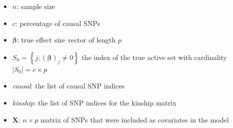 \documentclass[12pt,letter]{article}\usepackage[]{graphicx}\usepackage[]{color}
\newcommand{\bX}{\textbf{X}}
\newcommand{\bbeta}{\boldsymbol{\beta}}
\begin{document}
\begin{itemize}
	\item $n$: sample size
	\item $c$: percentage of causal SNPs
	\item $\bbeta$: true effect size vector of length $p$ 
	\item $S_0 = \left\lbrace j; (\bbeta)_j \neq 0 \right\rbrace$ the index of the true active set with cardinality $ |S_0| = c\times p$
	
	
	\item \textit{causal}: the list of causal SNP indices
	\item \textit{kinship}: the list of SNP indices for the kinship matrix
	\item $\bX$: $n \times p$ matrix of SNPs that were included as covariates in the model
	
\end{itemize}
\end{document}
